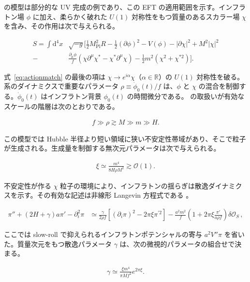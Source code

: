 \documentclass[a4paper,11pt]{ltjsarticle}
\numberwithin{equation}{section}
\newcommand{\dd}{\mathrm{d}}
\newcommand{\ee}{e}
\newcommand{\Eq}[1]{Eq.~(\ref{#1})}
\renewcommand{\Eq}[1]{式~\eqref{#1}}
\begin{document}
\cite{Creminelli:2023aly} の模型は部分的な UV 完成の例であり、この EFT の適用範囲を示す。インフラトン場 $\phi$ に加え、柔らかく破れた $U(1)$ 対称性をもつ質量のあるスカラー場 $\chi$ を含み、その作用は次で与えられる。

\begin{align}\label{eq:actionmatch}
S= \int \dd^4 x &\sqrt{- g} \bigg[ \frac{1}{2} M_{\mathrm{Pl}}^2  R - \frac{1}{2} \left(\partial \phi \right)^2 - V(\phi) - \left|\partial \chi \right|^2 + M^2 \left| \chi \right|^2 \nonumber \\
- &\frac{\partial_\mu \phi}{f}\left( \chi \partial^\mu \chi^* - \chi^* \partial^\mu \chi\right) - \frac{1}{2}m^2\left(\chi^2 + \chi^{*2}\right)\bigg].
\end{align}

\Eq{eq:actionmatch} の最後の項は $\chi\rightarrow\ee^{i\alpha}\chi$（$\alpha\in\mathbb{R}$）の $U(1)$ 対称性を破る。系のダイナミクスで重要なパラメータ $\rho\equiv\dot\phi_0(t)/f$ は、$\phi$ と $\chi$ の混合を制御する。$\dot\phi_0(t)$ はインフラトン背景 $\phi_0(t)$ の時間微分である。\cite{Creminelli:2023aly} の取扱いが有効なスケールの階層は次のとおりである。

\begin{align}
f \gg \rho \gtrsim M \gg m \gg H.
\end{align}

この模型では Hubble 半径より短い領域に狭い不安定性帯域があり、そこで粒子が生成される。生成量を制御する無次元パラメータは次で与えられる。

\begin{align}
\xi \simeq \frac{m^4}{8 H \rho M^2} \gtrsim \mathcal{O}(1).
\end{align}

不安定性が作る $\chi$ 粒子の環境により、インフラトンの揺らぎは散逸ダイナミクスを示す。その有効な記述は非線形 Langevin 方程式である \cite{Creminelli:2023aly}。

\begin{align}\label{eq:Paolo}
\pi'' + \left( 2H + \gamma\right)a\pi' - \partial_i^2 \pi &\simeq \frac{\gamma}{2\rho f} \left[ \left( \partial_i \pi\right)^2 - 2 \pi \xi \pi^{\prime2}\right] - \frac{a^2m^2}{f} \left(1+2\pi\xi \frac{\pi'}{a \rho f} \right) \delta \mathcal{O}_S\,,
\end{align}

ここでは slow-roll で抑えられるインフラトンポテンシャルの寄与 $a^2V''\pi$ を省いた。質量次元をもつ散逸パラメータ $\gamma$ は、次の微視的パラメータの組合せで決まる。

\begin{align}\label{eq:gammaCrem}
\gamma \simeq \frac{\xi m^4}{\pi M f^2} \ee^{2 \pi \xi}.
\end{align}
\end{document}
